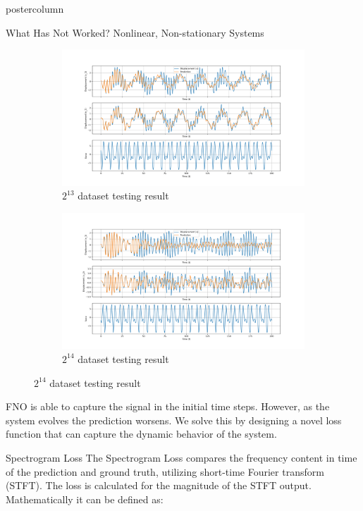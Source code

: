 \documentclass[mathserif]{beamer}
\begin{document}
\begin{frame}
\begin{columns}
\begin{beamercolorbox}[center,wd=\textwidth]{postercolumn}
\begin{minipage}[T]{.95\linewidth}
{\begin{block}{What Has Not Worked? Nonlinear, Non-stationary Systems}
\begin{figure}
\begin{subfigure}[b]{0.24\linewidth}
         \includegraphics[width=1\linewidth]{figures/8192_sobol_2dof_nlinear_tfno.png}
         \caption{$2^{13}$ dataset testing result}
         \label{fig:five over x}
     \end{subfigure}
     \hfill
     \begin{subfigure}[b]{0.24\linewidth}
         \centering
         \includegraphics[width=1\linewidth]{figures/16384_sobol_2dof_nlinear_tfno.png}
         \caption{$2^{14}$ dataset testing result}
         \label{fig:five over x}
     \end{subfigure}
        \label{fig:three graphs}
\end{figure}
FNO is able to capture the signal in the initial time steps. However, as the system evolves the prediction worsens. We solve this by designing a novel loss function that can capture the dynamic behavior of the system.
\end{block}



\begin{block}{Spectrogram Loss}
    The Spectrogram Loss compares the frequency content in time of the prediction and ground truth, utilizing short-time Fourier transform (STFT). The loss is calculated for the magnitude of the STFT output. Mathematically it can be defined as:\\


\end{block}}
\end{minipage}
\end{beamercolorbox}
\end{columns}
\end{frame}
\end{document}
